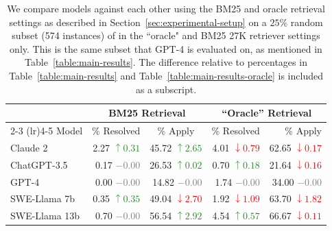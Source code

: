 
\begin{table}[ht]
\centering
\begin{tabular}{lrrrr}
\toprule
\multirow{2}{*}{} & \multicolumn{2}{c}{BM25 Retrieval} & \multicolumn{2}{c}{``Oracle'' Retrieval} \\
\cmidrule(lr){2-3} \cmidrule(lr){4-5} 
Model & \% Resolved & \multicolumn{1}{c}{\% Apply} & \% Resolved & \% Apply  \\
\midrule
Claude 2       & 2.27 \textcolor{forestgreen}{$\uparrow 0.31$} & 45.72 \textcolor{forestgreen}{$\uparrow 2.65$} & 4.01 \textcolor{red}{$\downarrow 0.79$} & 62.65 \textcolor{red}{$\downarrow 0.17$} \\
ChatGPT-3.5    & 0.17 \textcolor{gray}{$- 0.00$} & 26.53 \textcolor{forestgreen}{$\uparrow 0.02$} & 0.70 \textcolor{forestgreen}{$\uparrow 0.18$} & 21.64 \textcolor{red}{$\downarrow 0.16$} \\
GPT-4          & 0.00 \textcolor{gray}{$- 0.00$} & 14.82 \textcolor{gray}{$- 0.00$} & 1.74 \textcolor{gray}{$- 0.00$} & 34.00 \textcolor{gray}{$- 0.00$} \\
SWE-Llama 7b   & 0.35 \textcolor{forestgreen}{$\uparrow 0.35$} & 49.04 \textcolor{red}{$\downarrow 2.70$} & 1.92 \textcolor{red}{$\downarrow 1.09$} & 63.70 \textcolor{red}{$\downarrow 1.82$} \\
SWE-Llama 13b  & 0.70 \textcolor{gray}{$- 0.00$} & 56.54 \textcolor{forestgreen}{$\uparrow 2.92$} & 4.54 \textcolor{forestgreen}{$\uparrow 0.57$} & 66.67 \textcolor{red}{$\downarrow 0.11$} \\

\bottomrule
\end{tabular}
\caption{
We compare models against each other using the BM25 and oracle retrieval settings as described in Section~\ref{sec:experimental-setup} on a $25$\% random subset (574 instances) of \benchmark{} in the ``oracle" and BM25 27K retriever settings only. This is the same subset that GPT-4 is evaluated on, as mentioned in Table~\ref{table:main-results}. The difference relative to percentages in Table~\ref{table:main-results} and Table~\ref{table:main-results-oracle} is included as a subscript.
}
\label{table:main-results-20}
\end{table}

